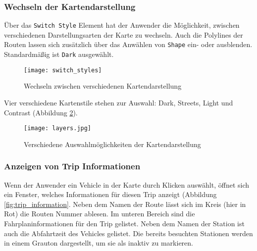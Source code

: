 
  \subsubsection*{Wechseln der Kartendarstellung}
  \label{ssub:style_auswahl}
    Über das \texttt{Switch Style} Element {\Large {}} hat der Anwender die Möglichkeit, zwischen verschiedenen Darstellungsarten der Karte zu wechseln. Auch die Polylines der Routen lassen sich zusätzlich über das Anwählen von \texttt{Shape} ein- oder ausblenden. Standardmäßig ist \texttt{Dark} ausgewählt.

    \begin{figure}[htbp]
      \begin{center}
        \texttt{[image: switch\_styles]}
        \caption{Wechseln zwischen verschiedenen Kartendarstellung}
        \label{fig:switch_styles}
      \end{center}
    \end{figure}

    Vier verschiedene Kartenstile stehen zur Auswahl: Dark, Streets, Light und Contrast (Abbildung \ref{fig:layers}).

    \begin{figure}[htbp]
      \begin{center}
        \texttt{[image: layers.jpg]}
        \caption{Verschiedene Auswahlmöglichkeiten der Kartendarstellung}
        \label{fig:layers}
      \end{center}
    \end{figure}
    

  \subsubsection*{Anzeigen von Trip Informationen}
  \label{ssub:anzeigen_von_trip_informationen}
    Wenn der Anwender ein Vehicle in der Karte durch Klicken auswählt, öffnet sich ein Fenster, welches Informationen für diesen Trip anzeigt (Abbildung \ref{fig:trip_information}. Neben dem Namen der Route lässt sich im Kreis (hier in Rot) die Routen Nummer ablesen. Im unteren Bereich sind die Fahrplaninformationen für den Trip gelistet. Neben dem Namen der Station ist auch die Abfahrtzeit des Vehicles gelistet. Die bereits besuchten Stationen werden in einem Grauton dargestellt, um sie als inaktiv zu markieren.

